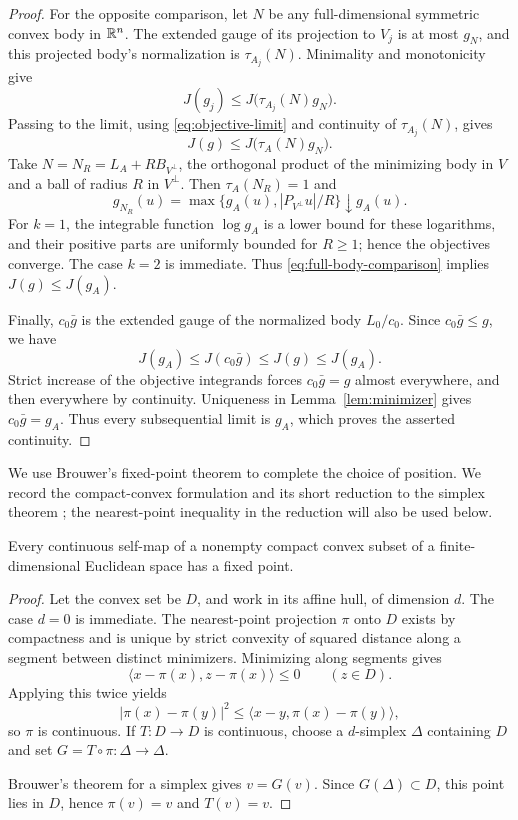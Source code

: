 \begin{proof}
For the opposite comparison, let $N$ be any full-dimensional
symmetric convex body in $\mathbb R^n$. The extended gauge of its
projection to $V_j$ is at most $g_N$, and this projected body's
normalization is $\tau_{A_j}(N)$. Minimality and monotonicity give
\[
 J(g_j)\le J\bigl(\tau_{A_j}(N)g_N\bigr).
\]
Passing to the limit, using \eqref{eq:objective-limit} and
continuity of $\tau_{A_j}(N)$, gives
\begin{equation}\label{eq:full-body-comparison}
 J(g)\le J\bigl(\tau_A(N)g_N\bigr).
\end{equation}
Take $N=N_R=L_A+RB_{V^\perp}$, the orthogonal product of the
minimizing body in $V$ and a ball of radius $R$ in $V^\perp$.
Then $\tau_A(N_R)=1$ and
\[
 g_{N_R}(u)=\max\{g_A(u),|P_{V^\perp}u|/R\}\downarrow g_A(u).
\]
For $k=1$, the integrable function $\log g_A$ is a lower bound
for these logarithms, and their positive parts are uniformly
bounded for $R\ge1$; hence the objectives converge. The case
$k=2$ is immediate. Thus \eqref{eq:full-body-comparison} implies
$J(g)\le J(g_A)$.

Finally, $c_0\bar g$ is the extended gauge of the normalized
body $L_0/c_0$. Since $c_0\bar g\le g$, we have
\[
 J(g_A)\le J(c_0\bar g)\le J(g)\le J(g_A).
\]
Strict increase of the objective integrands forces
$c_0\bar g=g$ almost everywhere, and then everywhere by continuity.
Uniqueness in Lemma~\ref{lem:minimizer} gives
$c_0\bar g=g_A$. Thus every subsequential limit is $g_A$, which
proves the asserted continuity.
\end{proof}

We use Brouwer's fixed-point theorem to complete the choice of
position. We record the compact-convex formulation and its short
reduction to the simplex theorem \cite[Satz~4, p.~115]{Brouwer1911};
the nearest-point inequality in the reduction will also be used below.

\begin{lemma}\label{lem:fixed-point}
Every continuous self-map of a nonempty compact convex subset of a
finite-dimensional Euclidean space has a fixed point.
\end{lemma}

\begin{proof}
Let the convex set be $D$, and work in its affine hull, of dimension
$d$. The case $d=0$ is immediate. The nearest-point projection
$\pi$ onto $D$ exists by compactness and is unique by strict
convexity of squared distance along a segment between distinct
minimizers. Minimizing along segments gives
\[
 \langle x-\pi(x),z-\pi(x)\rangle\le0\qquad(z\in D).
\]
Applying this twice yields
\[
 |\pi(x)-\pi(y)|^2
 \le\langle x-y,\pi(x)-\pi(y)\rangle,
\]
so $\pi$ is continuous. If $T:D\to D$ is continuous, choose a
$d$-simplex $\Delta$ containing $D$ and set
$G=T\circ\pi:\Delta\to\Delta$.

Brouwer's theorem for a simplex gives $v=G(v)$.
Since $G(\Delta)\subset D$, this point lies in $D$, hence
$\pi(v)=v$ and $T(v)=v$.
\end{proof}

